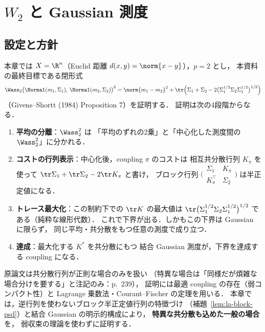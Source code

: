 \chapter{\texorpdfstring{$W_2$}{W2} と Gaussian 測度}
\label{ch:gaussian}

\section{設定と方針}
\label{sec:gauss-setting}

本章では $X=\R^n$（Euclid 距離 $d(x,y)=\norm{x-y}$），$p=2$ とし，
本資料の最終目標である閉形式
\[
  \Wass_2\bigl(\Normal(m_1,\Sigma_1),\,\Normal(m_2,\Sigma_2)\bigr)^2
  =
  \norm{m_1-m_2}^2
  +\tr\Bigl(\Sigma_1+\Sigma_2
    -2\bigl(\Sigma_1^{1/2}\Sigma_2\Sigma_1^{1/2}\bigr)^{1/2}\Bigr)
\]
（Givens--Shortt (1984) Proposition 7）を証明する．
証明は次の4段階からなる．
\begin{enumerate}
  \item \textbf{平均の分離}：$\Wass_2^2$ は
    「平均のずれの2乗」と「中心化した測度間の $\Wass_2^2$」に分かれる．
  \item \textbf{コストの行列表示}：中心化後，coupling $\pi$ のコストは
    相互共分散行列 $K_\pi$ を使って
    $\tr\Sigma_1+\tr\Sigma_2-2\tr K_\pi$ と書け，
    ブロック行列 $\bigl(\begin{smallmatrix}\Sigma_1&K_\pi\\K_\pi^\top&\Sigma_2\end{smallmatrix}\bigr)$
    は半正定値になる．
  \item \textbf{トレース最大化}：この制約下での $\tr K$ の最大値は
    $\tr\bigl(\Sigma_1^{1/2}\Sigma_2\Sigma_1^{1/2}\bigr)^{1/2}$
    である（純粋な線形代数）．
    これで下界が出る．しかもこの下界は Gaussian に限らず，
    同じ平均・共分散をもつ任意の測度で成り立つ．
  \item \textbf{達成}：最大化する $K^*$ を共分散にもつ
    結合 Gaussian 測度が，下界を達成する coupling になる．
\end{enumerate}
原論文は共分散行列が正則な場合のみを扱い
（特異な場合は「同様だが煩雑な場合分けを要する」と注記のみ：p.~239），
証明には最適 coupling の存在（弱コンパクト性）と
Lagrange 乗数法・Courant--Fischer の定理を用いる．
本章では，逆行列を使わないブロック半正定値行列の特徴づけ
（補題~\ref{lem:la-block-psd}）と結合 Gaussian の明示的構成により，
\textbf{特異な共分散も込めた一般の場合}を，
弱収束の理論を使わずに証明する．

